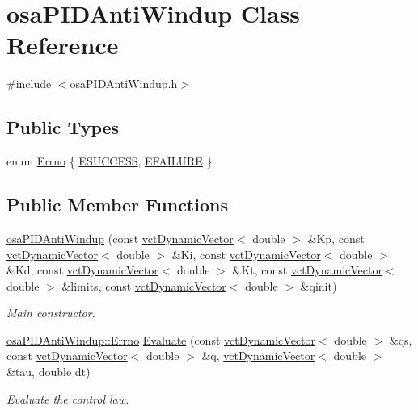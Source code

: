 \hypertarget{classosa_p_i_d_anti_windup}{\section{osa\-P\-I\-D\-Anti\-Windup Class Reference}
\label{classosa_p_i_d_anti_windup}
}


{\ttfamily \#include $<$osa\-P\-I\-D\-Anti\-Windup.\-h$>$}

\subsection*{Public Types}
\begin{DoxyCompactItemize}
\item 
enum \hyperlink{classosa_p_i_d_anti_windup_ab655b152550fb621ee6d522bd793b310}{Errno} \{ \hyperlink{classosa_p_i_d_anti_windup_ab655b152550fb621ee6d522bd793b310aca75d02e8908f3345bfad5bbe8678523}{E\-S\-U\-C\-C\-E\-S\-S}, 
\hyperlink{classosa_p_i_d_anti_windup_ab655b152550fb621ee6d522bd793b310a0ab9e5fcfd01e987bef306b47ff2a8a3}{E\-F\-A\-I\-L\-U\-R\-E}
 \}
\end{DoxyCompactItemize}
\subsection*{Public Member Functions}
\begin{DoxyCompactItemize}
\item 
\hyperlink{classosa_p_i_d_anti_windup_a0ffc08fd3a706fdab6f3eb65fe8af038}{osa\-P\-I\-D\-Anti\-Windup} (const \hyperlink{classvct_dynamic_vector}{vct\-Dynamic\-Vector}$<$ double $>$ \&Kp, const \hyperlink{classvct_dynamic_vector}{vct\-Dynamic\-Vector}$<$ double $>$ \&Ki, const \hyperlink{classvct_dynamic_vector}{vct\-Dynamic\-Vector}$<$ double $>$ \&Kd, const \hyperlink{classvct_dynamic_vector}{vct\-Dynamic\-Vector}$<$ double $>$ \&Kt, const \hyperlink{classvct_dynamic_vector}{vct\-Dynamic\-Vector}$<$ double $>$ \&limits, const \hyperlink{classvct_dynamic_vector}{vct\-Dynamic\-Vector}$<$ double $>$ \&qinit)
\begin{DoxyCompactList}\small\item\em Main constructor. \end{DoxyCompactList}\item 
\hyperlink{classosa_p_i_d_anti_windup_ab655b152550fb621ee6d522bd793b310}{osa\-P\-I\-D\-Anti\-Windup\-::\-Errno} \hyperlink{classosa_p_i_d_anti_windup_a8c370639ecde55fdea4c29eb1b345c22}{Evaluate} (const \hyperlink{classvct_dynamic_vector}{vct\-Dynamic\-Vector}$<$ double $>$ \&qs, const \hyperlink{classvct_dynamic_vector}{vct\-Dynamic\-Vector}$<$ double $>$ \&q, \hyperlink{classvct_dynamic_vector}{vct\-Dynamic\-Vector}$<$ double $>$ \&tau, double dt)
\begin{DoxyCompactList}\small\item\em Evaluate the control law. \end{DoxyCompactList}\end{DoxyCompactItemize}


